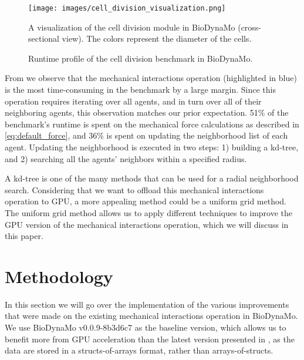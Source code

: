 \documentclass[conference]{IEEEtran}
\begin{document}
\begin{figure}[!t]
    \centering
    \texttt{[image: images/cell\_division\_visualization.png]}
    \caption{A visualization of the cell division module in BioDynaMo (cross-sectional view). The colors represent the diameter of the cells.}
    \label{fig:cell_division}
\end{figure}

\begin{figure}[!t]
    \centering
    
    \caption{Runtime profile of the cell division benchmark in BioDynaMo.}
    \label{fig:flamegraph}
\end{figure}


\par From  we observe that the mechanical interactions operation (highlighted in blue) is the most time-consuming in the benchmark by a large margin.
Since this operation requires iterating over all agents, and in turn over all of their neighboring agents, this observation matches our prior expectation.
51\% of the benchmark's runtime is spent on the mechanical force calculations as described in \eqref{eq:default_force}, and 36\% is spent on updating the neighborhood list of each agent.
Updating the neighborhood is executed in two steps: 1) building a kd-tree, and 2) searching all the agents' neighbors within a specified radius.
\par A kd-tree is one of the many methods that can be used for a radial neighborhood search.
Considering that we want to offload this mechanical interactions operation to GPU, a more appealing method could be a uniform grid method.
The uniform grid method allows us to apply different techniques to improve the GPU version of the mechanical interactions operation, which we will discuss in this paper.

\section{Methodology} \label{sec:methodology}
\par In this section we will go over the implementation of the various improvements that were made on the existing mechanical interactions operation in BioDynaMo.
We use BioDynaMo v0.0.9-8b3d6c7 as the baseline version, which allows us to benefit more from GPU acceleration than the latest version presented in \cite{breitwieser2021biodynamo}, as the data are stored in a structs-of-arrays format, rather than arrays-of-structs.
\end{document}
